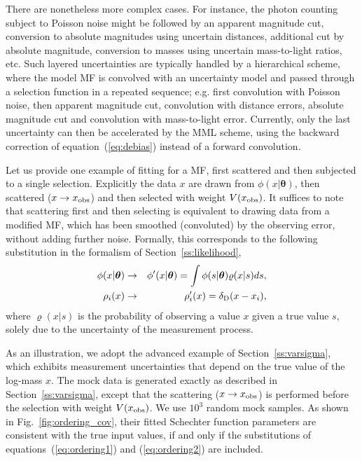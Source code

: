 \documentclass[a4paper,fleqn,usenatbib]{mnras}
\newcommand{\bea}{\begin{eqnarray}}
\newcommand{\eea}{\end{eqnarray}}
\newcommand{\fig}[1]{Fig.~\ref{fig:#1}}
\newcommand{\eq}[1]{equation~(\ref{eq:#1})}
\renewcommand{\ss}[1]{Section~\ref{ss:#1}}
\newcommand{\para}{{\bm{\theta}}}
\begin{document}
There are nonetheless more complex cases. For instance, the photon counting subject to Poisson noise might be followed by an apparent magnitude cut, conversion to absolute magnitudes using uncertain distances, additional cut by absolute magnitude, conversion to masses using uncertain mass-to-light ratios, etc. Such layered uncertainties are typically handled by a hierarchical scheme, where the model MF is convolved with an uncertainty model and passed through a selection function in a repeated sequence; e.g. first convolution with Poisson noise, then apparent magnitude cut, convolution with distance errors, absolute magnitude cut and convolution with mass-to-light error. Currently, only the last uncertainty can then be accelerated by the MML scheme, using the backward correction of \eq{debias} instead of a forward convolution.

Let us provide one example of fitting for a MF, first scattered and then subjected to a single selection. Explicitly the data $x$ are drawn from $\phi(x|\para)$, then scattered ($x\rightarrow x_{\rm obs}$) and then selected with weight $V(x_{\rm obs})$. It suffices to note that scattering first and then selecting is equivalent to drawing data from a modified MF, which has been smoothed (convoluted) by the observing error, without adding further noise. Formally, this corresponds to the following substitution in the formalism of \ss{likelihood},
%
\bea
	\phi(x|\para) &\rightarrow& \phi'(x|\para) = \int \phi(s|\para)\varrho(x|s)ds,\label{eq:ordering1}\\
	\rho_i(x) &\rightarrow& \rho'_i(x) = \delta_{\rm D}(x-x_i),\label{eq:ordering2}
\eea
%
where $\varrho(x|s)$ is the probability of observing a value $x$ given a true value $s$, solely due to the uncertainty of the measurement process.

As an illustration, we adopt the advanced example of \ss{varsigma}, which exhibits measurement uncertainties that depend on the true value of the log-mass $x$. The mock data is generated exactly as described in \ss{varsigma}, except that the scattering ($x\rightarrow x_{\rm obs}$) is performed before the selection with weight $V(x_{\rm obs})$. We use $10^3$ random mock samples. As shown in \fig{ordering_cov}, their fitted Schechter function parameters are consistent with the true input values, if and only if the substitutions of equations~(\ref{eq:ordering1}) and (\ref{eq:ordering2}) are included.

\end{document}
